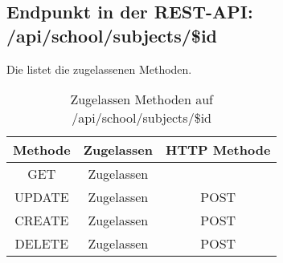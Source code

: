 \subsection{Endpunkt in der REST-API: /api/school/subjects/\$id}
Die  listet die zugelassenen Methoden. 

\begin{table}[!htbp]
	\begin{tabular}{|c|c|c|}
		\hline
			\textbf{Methode} & \textbf{Zugelassen} & \textbf{HTTP Methode} \\ \hline
			GET & Zugelassen &  \\ \hline
			UPDATE & Zugelassen & POST \\ \hline 
			CREATE & Zugelassen & POST \\ \hline 
			DELETE & Zugelassen & POST \\ \hline
	\end{tabular}

		\caption{Zugelassen Methoden auf /api/school/subjects/\$id}
		\label{tab:end:rest:api:school:subjects:id:meth}
\end{table}